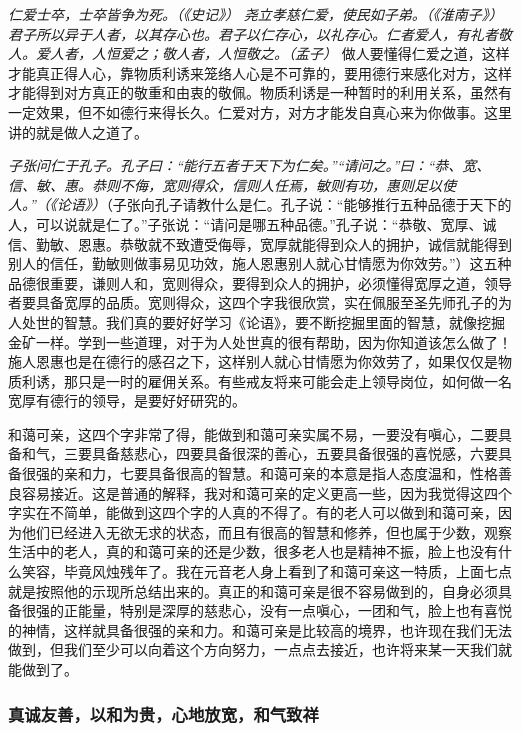 \textit{仁爱士卒，士卒皆争为死。（《史记》）} \textit{尧立孝慈仁爱，使民如子弟。（《淮南子》）} \textit{君子所以异于人者，以其存心也。君子以仁存心，以礼存心。仁者爱人，有礼者敬人。爱人者，人恒爱之；敬人者，人恒敬之。（孟子）} 做人要懂得仁爱之道，这样才能真正得人心，靠物质利诱来笼络人心是不可靠的，要用德行来感化对方，这样才能得到对方真正的敬重和由衷的敬佩。物质利诱是一种暂时的利用关系，虽然有一定效果，但不如德行来得长久。仁爱对方，对方才能发自真心来为你做事。这里讲的就是做人之道了。

\textit{子张问仁于孔子。孔子曰：“能行五者于天下为仁矣。”“请问之。”曰：“恭、宽、信、敏、惠。恭则不侮，宽则得众，信则人任焉，敏则有功，惠则足以使人。”（《论语》）}（子张向孔子请教什么是仁。孔子说：“能够推行五种品德于天下的人，可以说就是仁了。”子张说：“请问是哪五种品德。”孔子说：“恭敬、宽厚、诚信、勤敏、恩惠。恭敬就不致遭受侮辱，宽厚就能得到众人的拥护，诚信就能得到别人的信任，勤敏则做事易见功效，施人恩惠别人就心甘情愿为你效劳。”）这五种品德很重要，谦则人和，宽则得众，要得到众人的拥护，必须懂得宽厚之道，领导者要具备宽厚的品质。宽则得众，这四个字我很欣赏，实在佩服至圣先师孔子的为人处世的智慧。我们真的要好好学习《论语》，要不断挖掘里面的智慧，就像挖掘金矿一样。学到一些道理，对于为人处世真的很有帮助，因为你知道该怎么做了！施人恩惠也是在德行的感召之下，这样别人就心甘情愿为你效劳了，如果仅仅是物质利诱，那只是一时的雇佣关系。有些戒友将来可能会走上领导岗位，如何做一名宽厚有德行的领导，是要好好研究的。

和蔼可亲，这四个字非常了得，能做到和蔼可亲实属不易，一要没有嗔心，二要具备和气，三要具备慈悲心，四要具备很深的善心，五要具备很强的喜悦感，六要具备很强的亲和力，七要具备很高的智慧。和蔼可亲的本意是指人态度温和，性格善良容易接近。这是普通的解释，我对和蔼可亲的定义更高一些，因为我觉得这四个字实在不简单，能做到这四个字的人真的不得了。有的老人可以做到和蔼可亲，因为他们已经进入无欲无求的状态，而且有很高的智慧和修养，但也属于少数，观察生活中的老人，真的和蔼可亲的还是少数，很多老人也是精神不振，脸上也没有什么笑容，毕竟风烛残年了。我在元音老人身上看到了和蔼可亲这一特质，上面七点就是按照他的示现所总结出来的。真正的和蔼可亲是很不容易做到的，自身必须具备很强的正能量，特别是深厚的慈悲心，没有一点嗔心，一团和气，脸上也有喜悦的神情，这样就具备很强的亲和力。和蔼可亲是比较高的境界，也许现在我们无法做到，但我们至少可以向着这个方向努力，一点点去接近，也许将来某一天我们就能做到了。

\subsubsection{真诚友善，以和为贵，心地放宽，和气致祥}

